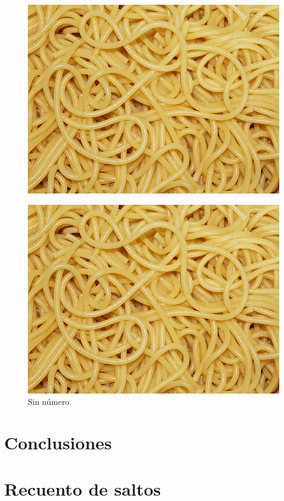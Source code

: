 \documentclass{tfg_domingo}
\begin{document}
\lipsum[39-41]

\begin{figure}[ht!]
\begin{center}
\includegraphics[width=\linewidth]{espaguetis}
\caption{}
\end{center}
\end{figure}

\lipsum[42-43]

\begin{figure}[ht!]
\begin{center}
\includegraphics[width=\linewidth]{espaguetis}
\caption*{Sin número}
\end{center}
\end{figure}

\lipsum[45]

\chapter{Conclusiones}

\lipsum[46-52]

\appendix
\chapter{Recuento de saltos}

\lipsum[1-24]

\backmatter

\end{document}
